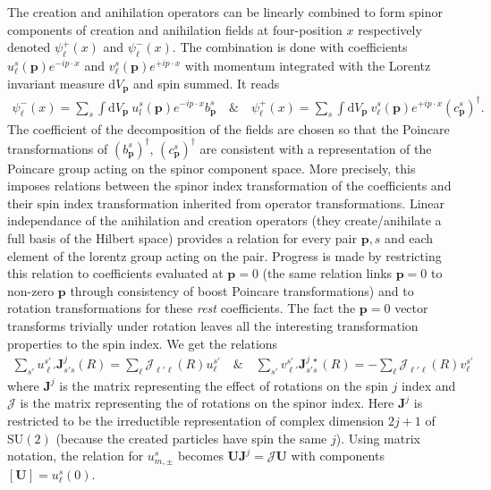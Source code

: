 \documentclass[10pt, a4paper]{article}
\begin{document}
The creation and anihilation operators can be linearly combined to form spinor components of creation and anihilation fields at four-position $x$ respectively denoted $\psi^{+}_\ell(x)$ and $\psi^{-}_\ell(x)$. The combination is done with coefficients $u_\ell^s(\mathbf{p}) e^{-i p \cdot x}$ and $v_\ell^s(\mathbf{p}) e^{+i p \cdot x}$ with momentum integrated with the Lorentz invariant measure $\text{d}V_\mathbf{p}$ and spin summed. It reads 
\begin{align*}
  \psi^{-}_\ell(x) = \sum_s \int \text{d}V_\mathbf{p} \ u_l^s(\mathbf{p}) e^{-i p \cdot x} b_\mathbf{p}^s  \quad \&\quad \psi^{+}_\ell(x) = \sum_s \int \text{d}V_\mathbf{p} \ v_\ell^s(\mathbf{p}) e^{+i p \cdot x} (c_\mathbf{p}^s)^\dagger.
\end{align*}
The coefficient of the decomposition of the fields are chosen so that the Poincare transformations of $(b_\mathbf{p}^s)^\dagger$, $(c_\mathbf{p}^s)^\dagger$ are consistent with a representation of the Poincare group acting on the spinor component space. More precisely, this imposes relations between the spinor index transformation of the coefficients and their spin index transformation inherited from operator transformations. Linear independance of the anihilation and creation operators (they create/anihilate a full basis of the Hilbert space) provides a relation for every pair $\mathbf{p}, s$ and each element of the lorentz group acting on the pair. Progress is made by restricting this relation to coefficients evaluated at $\mathbf{p} = 0$ (the same relation links $\mathbf{p} = 0$ to non-zero $\mathbf{p}$ through consistency of boost Poincare transformations) and to rotation transformations for these \textit{rest} coefficients. The fact the $\mathbf{p}=0$ vector transforms trivially under rotation leaves all the interesting transformation properties to the spin index. We get the relations 
\begin{align*}
  \sum_{s'} u_{\ell'}^{s'} \mathbf{J}_{s's}^{j} (R) = \sum_{\ell} \mathcal{J}_{\ell'\ell} (R) u_{\ell}^{s'}\quad \& \quad \sum_{s'} v_{\ell'}^{s'} \mathbf{J}_{s's}^{j\ \star} (R) = -\sum_{\ell} \mathcal{J}_{\ell'\ell} (R) v_{\ell}^{s'}
\end{align*}
where $\mathbf{J}^{j}$ is the matrix representing the effect of rotations on the spin $j$ index and $\mathcal{J}$ is the matrix representing the of rotations on the spinor index.  Here $\mathbf{J}^j$ is restricted to be the irreductible representation of complex dimension $2j+1$ of $\text{SU}(2)$ (because the created particles have spin the same $j$). Using matrix notation, the relation for $u_{m, \pm}^{s}$ becomes 
$
  \mathbf{U}\mathbf{J}^{j} = \mathcal{J}\mathbf{U}
$
with components $[\mathbf{U}] = u_\ell^s(0)$. 
\end{document}

